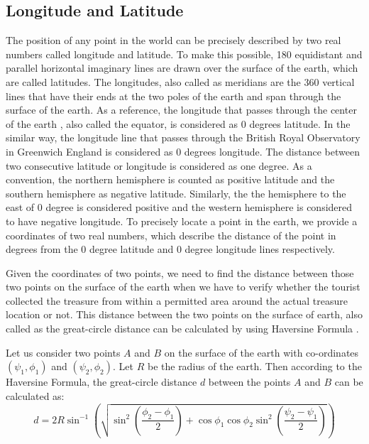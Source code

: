 \documentclass[12pt, a4paper, oneside]{article}
\begin{document}
\subsection{Longitude and Latitude} \label{latlng}
The position of any point in the world can be precisely described by two real numbers called longitude and latitude. To make this possible, 180 equidistant and parallel horizontal imaginary lines are drawn over the surface of the earth, which are called latitudes. The longitudes, also called as meridians are the 360 vertical lines that have their ends at the two poles of the earth and span through the surface of the earth. As a reference, the longitude that passes through the center of the earth , also called the equator, is considered as 0 degrees latitude. In the similar way, the longitude line that passes through the British Royal Observatory in Greenwich England is considered as 0 degrees longitude. The distance between two consecutive latitude or longitude is considered as one degree. As a convention, the northern hemisphere is counted as positive latitude and the southern hemisphere as negative latitude. Similarly, the the hemisphere to the east of 0 degree is considered positive and the western hemisphere is considered to have negative longitude. To precisely locate a point in the earth, we provide a coordinates of two real numbers, which describe the distance of the point in degrees from the 0 degree latitude and 0 degree longitude lines respectively.

Given the coordinates of two points, we need to find the distance between those two points on the surface of the earth when we have to verify whether the tourist collected the treasure from within a permitted area around the actual treasure location or not. This distance between the two points on the surface of earth, also called as the great-circle distance can be calculated by using Haversine Formula \cite{haversine}.

Let us consider two points $A$ and $B$ on the surface of the earth with co-ordinates $(\psi_1, \phi_1)$ and $(\psi_2, \phi_2)$. Let $R$ be the radius of the earth. Then according to the Haversine Formula, the great-circle distance $d$ between the points $A$ and $B$ can be calculated as:
\begin{equation}
 d = 2R \sin^{-1} \left( \sqrt { \sin^2 \left( \frac{\phi_2 - \phi_1}{2} \right) + \cos{\phi_1} \cos{\phi_2} \sin^2 \left( \frac{\psi_2 - \psi_1}{2} \right) } \right) 
\end{equation}
\end{document}
